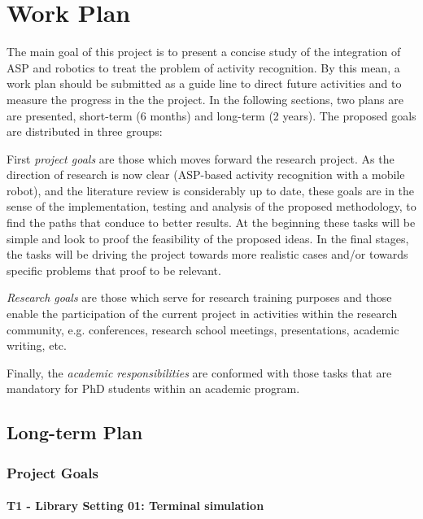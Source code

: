 \chapter{Work Plan}

The main goal of this project is to present a concise study of the integration of ASP and robotics to treat the problem of activity recognition.
By this mean, a work plan should be submitted as a guide line to direct future activities and to measure the progress in the the project. In the following sections, two plans are are presented, short-term (6 months) and long-term (2 years). The proposed goals are distributed in three groups:

First \textit{project goals} are those which moves forward the research project. 
As the direction of research is now clear (ASP-based activity recognition with a mobile robot), and the literature review is considerably up to date, these goals are in the sense of the implementation, testing and analysis of the proposed methodology, to find the paths that conduce to better results. 
At the beginning these tasks will be simple and look to proof the feasibility of the proposed ideas. 
In the final stages, the tasks will be driving the project towards more realistic cases and/or towards specific problems that proof to be relevant.

\textit{Research goals} are those which serve for research training purposes and those enable the participation of the current project in activities within the research community, e.g. conferences, research school meetings, presentations, academic writing, etc.

Finally, the \textit{academic responsibilities} are conformed with those tasks that are mandatory for PhD students within an academic program.


\section{Long-term Plan}


\subsection{Project Goals}

\subsubsection*{T1 - Library Setting 01: Terminal simulation}

